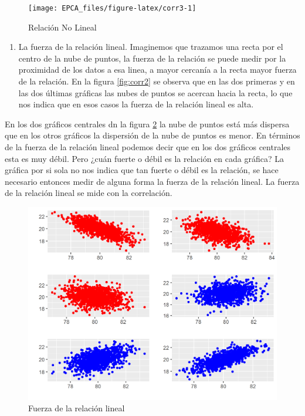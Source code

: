 \documentclass[letterpaper,]{book}
\providecommand{\tightlist}{%
  \setlength{\itemsep}{0pt}\setlength{\parskip}{0pt}}
\begin{document}
\begin{figure}[!h]

{\centering \texttt{[image: EPCA\_files/figure-latex/corr3-1]} 

}

\caption{Relación No Lineal}\label{fig:corr3}
\end{figure}

\begin{enumerate}
\def\labelenumi{\arabic{enumi}.}
\setcounter{enumi}{2}
\tightlist
\item
  La fuerza de la relación lineal. Imaginemos que trazamos una recta por el centro de la nube de puntos, la fuerza de la relación se puede medir por la proximidad de los datos a esa linea, a mayor cercanía a la recta mayor fuerza de la relación. En la figura \ref{fig:corr2} se observa que en las dos primeras y en las dos últimas gráficas las nubes de puntos se acercan hacia la recta, lo que nos indica que en esos casos la fuerza de la relación lineal es alta.
\end{enumerate}

En los dos gráficos centrales dn la figura \ref{fig:corr4} la nube de puntos está más dispersa que en los otros gráficos la dispersión de la nube de puntos es menor. En términos de la fuerza de la relación lineal podemos decir que en los dos gráficos centrales esta es muy débil. Pero ¿cuán fuerte o débil es la relación en cada gráfica? La gráfica por si sola no nos indica que tan fuerte o débil es la relación, se hace necesario entonces medir de alguna forma la fuerza de la relación lineal. La fuerza de la relación lineal se mide con la correlación.

\begin{figure}[!h]

{\centering \includegraphics[width=0.5\linewidth]{corr3} 

}

\caption{Fuerza de la relación lineal}\label{fig:corr4}
\end{figure}
\end{document}

